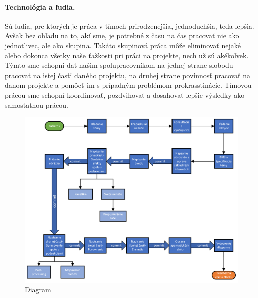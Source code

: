 \documentclass[10pt,twoside,slovak,a4paper]{article}
\begin{document}
\paragraph{Technológia a ľudia.} Sú ľudia, pre ktorých je práca v tímoch prirodzenejšia, 
jednoduchšia, teda lepšia. Avšak bez ohľadu na to, akí sme, je potrebné z času na čas 
pracovať nie ako jednotlivec, ale ako skupina. Takáto skupinová práca môže eliminovať nejaké 
alebo dokonca všetky naše ťažkosti pri práci na projekte, nech už sú akékoľvek. Týmto sme 
schopní dať našim spolupracovníkom na jednej strane slobodu pracovať na istej časti daného 
projektu, na druhej strane povinnosť pracovať na danom projekte a pomôcť im s prípadným 
problémom prokrasstinácie. Tímovou prácou sme schopní koordinovať, pozdvihovať a dosahovať 
lepšie výsledky ako samostatnou prácou.







\begin{figure}[p]
    \centering
    \includegraphics[scale=0.8]{Kresba1.png}
    \caption{Diagram}
    \label{dia}
\end{figure}
\end{document}
